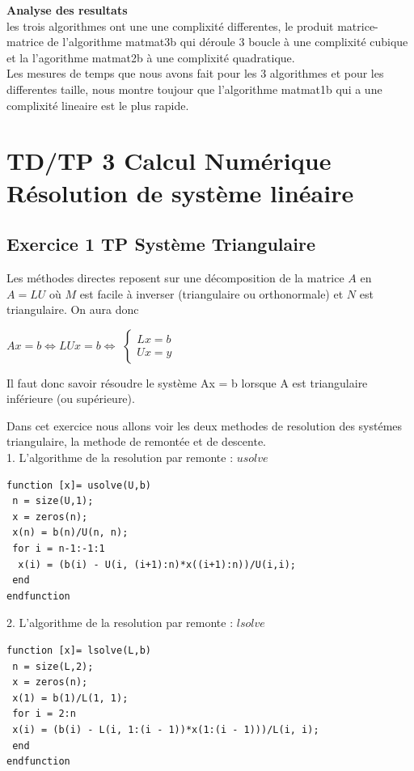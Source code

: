 \documentclass[12pt]{report}
\begin{document}
\textbf{Analyse des resultats}\\

les trois algorithmes ont une une complixité differentes, le produit matrice-matrice de l'algorithme matmat3b qui déroule 3 boucle à une complixité cubique et la l'agorithme matmat2b à une complixité quadratique.\\

Les mesures de temps que nous avons fait pour les 3 algorithmes et pour les differentes taille, nous montre toujour que l'algorithme matmat1b qui a une complixité lineaire est le plus rapide. 
 
\chapter{TD/TP 3 Calcul Numérique Résolution de système linéaire}
\section{Exercice 1 TP Système Triangulaire}

Les méthodes directes reposent sur une décomposition de la matrice $A$ en $A = LU$ où $M$ est facile à inverser (triangulaire ou orthonormale) et $N$ est triangulaire. On aura donc
\begin{center}
$Ax = b \Leftrightarrow LUx = b \Leftrightarrow $ $\left\{\begin{array}{l} Lx=b \\ Ux=y\end{array}\right.$
\end{center}
Il faut donc savoir résoudre le système Ax = b lorsque A est triangulaire inférieure (ou supérieure).


Dans cet exercice nous allons voir les deux methodes de resolution des systémes triangulaire, la methode de remontée et de descente.\\

1. L'algorithme de la resolution par remonte : $usolve$ 

\begin{lstlisting}
function [x]= usolve(U,b)
 n = size(U,1);
 x = zeros(n);
 x(n) = b(n)/U(n, n);
 for i = n-1:-1:1
  x(i) = (b(i) - U(i, (i+1):n)*x((i+1):n))/U(i,i);
 end
endfunction
\end{lstlisting} 
         
2. L'algorithme de la resolution par remonte : $lsolve$ 

\begin{lstlisting}
function [x]= lsolve(L,b)
 n = size(L,2);
 x = zeros(n);
 x(1) = b(1)/L(1, 1);
 for i = 2:n
 x(i) = (b(i) - L(i, 1:(i - 1))*x(1:(i - 1)))/L(i, i);
 end 
endfunction 
\end{lstlisting}          
 
\end{document}
